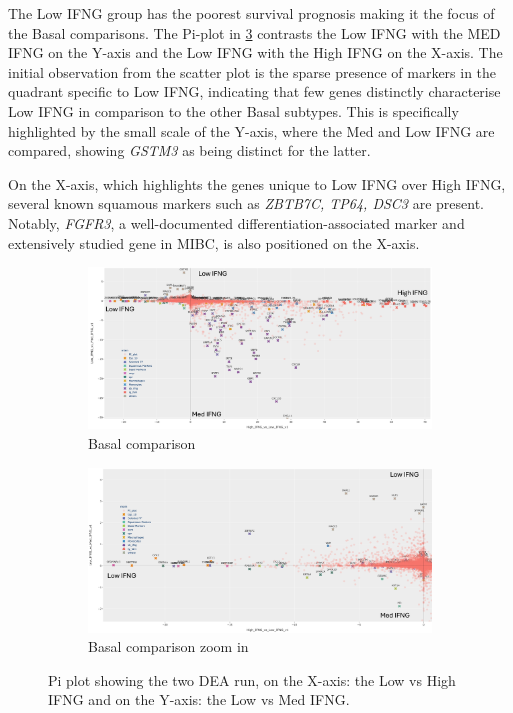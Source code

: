 The Low IFNG group has the poorest survival prognosis making it the focus of the Basal comparisons. The Pi-plot in \cref{fig:cs:pi_basal} contrasts the Low IFNG with the MED IFNG on the Y-axis and the Low IFNG with the High IFNG on the X-axis. The initial observation from the scatter plot is the sparse presence of markers in the quadrant specific to Low IFNG, indicating that few genes distinctly characterise Low IFNG in comparison to the other Basal subtypes. This is specifically highlighted by the small scale of the Y-axis, where the Med and Low IFNG are compared, showing \textit{GSTM3} as being distinct for the latter.

On the X-axis, which highlights the genes unique to Low IFNG over High IFNG, several known squamous markers such as \textit{ZBTB7C, TP64, DSC3} are present. Notably, \textit{FGFR3}, a well-documented differentiation-associated marker and extensively studied gene in MIBC, is also positioned on the X-axis.

\begin{figure}[!htb]
    \centering
    \begin{subfigure}[!t]{1.0\textwidth}
        \includegraphics[width=\textwidth,keepaspectratio]{Sections/ClusteringAnalysis/Resources/discussion/basal_comp_pi.png}    
        \caption{Basal comparison}
        \label{fig:cs:basal_comp}
    \end{subfigure}
    \centering
    \begin{subfigure}[!t]{1.0\textwidth}
        \includegraphics[width=\textwidth, keepaspectratio]{Sections/ClusteringAnalysis/Resources/discussion/basal_comp_pi_zoom.png}
        \caption{Basal comparison zoom in}
        \label{fig:cs:basal_comp_zoom}
    \end{subfigure} 
    \centering
    \caption{Pi plot showing the two DEA run, on the X-axis: the Low vs High IFNG and on the Y-axis: the Low vs Med IFNG.} 
    \label{fig:cs:pi_basal}
\end{figure}


